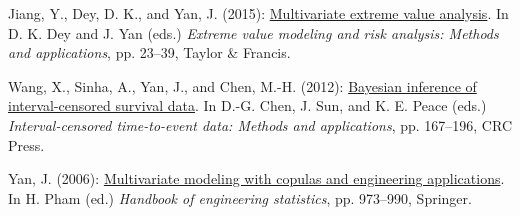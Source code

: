 \begin{CVBookChapters}
\item *Jiang, Y., Dey, D. K., and Yan, J. (2015):
\href{https://doi.org/10.1201/b19721-6}{Multivariate extreme value
analysis}. In D. K. Dey and J. Yan (eds.) \emph{Extreme value modeling
and risk analysis: Methods and applications}, pp. 23--39, Taylor \&
Francis.

\item *Wang, X., Sinha, A., Yan, J., and Chen, M.-H. (2012):
\href{https://doi.org/10.1201/b12290-10}{Bayesian inference of
interval-censored survival data}. In D.-G. Chen, J. Sun, and K. E. Peace
(eds.) \emph{Interval-censored time-to-event data: Methods and
applications}, pp. 167--196, CRC Press.

\item Yan, J. (2006):
\href{https://doi.org/10.1007/978-1-84628-288-1_51}{Multivariate
modeling with copulas and engineering applications}. In H. Pham (ed.)
\emph{Handbook of engineering statistics}, pp. 973--990, Springer.

\end{CVBookChapters}

